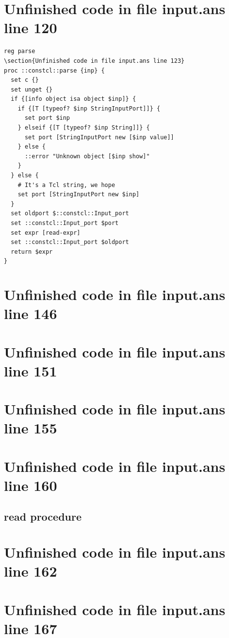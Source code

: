\documentclass[twoside,9pt]{report}
\begin{document}
\section{Unfinished code in file input.ans line 120}
\begin{lstlisting}
reg parse
\section{Unfinished code in file input.ans line 123}
proc ::constcl::parse {inp} {
  set c {}
  set unget {}
  if {[info object isa object $inp]} {
    if {[T [typeof? $inp StringInputPort]]} {
      set port $inp
    } elseif {[T [typeof? $inp String]]} {
      set port [StringInputPort new [$inp value]]
    } else {
      ::error "Unknown object [$inp show]"
    }
  } else {
    # It's a Tcl string, we hope
    set port [StringInputPort new $inp]
  }
  set oldport $::constcl::Input_port
  set ::constcl::Input_port $port
  set expr [read-expr]
  set ::constcl::Input_port $oldport
  return $expr
}
\end{lstlisting}
\section{Unfinished code in file input.ans line 146}
\section{Unfinished code in file input.ans line 151}
\section{Unfinished code in file input.ans line 155}
\section{Unfinished code in file input.ans line 160}
\subsection{read procedure}
\label{read-procedure}
\section{Unfinished code in file input.ans line 162}

\section{Unfinished code in file input.ans line 167}
\end{document}
